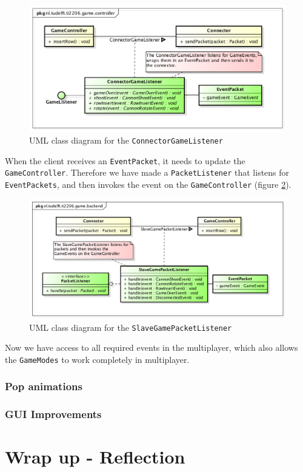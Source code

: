 \documentclass[a4paper]{article}
\begin{document}
\begin{figure}[H]
	\centering
	\includegraphics[scale=0.5]{ConnectorGameListenerExtended.png}
    \caption{UML class diagram for the \texttt{ConnectorGameListener} }
    \label{fig:connectorgamelistener}
\end{figure}

When the client receives an \texttt{EventPacket}, it needs to update the \texttt{GameController}. Therefore we have made a \texttt{PacketListener} that listens for \texttt{EventPackets}, and then invokes the event on the \texttt{GameController} (figure \ref{fig:slavegamepacketlistener}).

\begin{figure}[H]
	\centering
	\includegraphics[scale=0.5]{SlaveGamePacketListener.png}
    \caption{UML class diagram for the \texttt{SlaveGamePacketListener} }
    \label{fig:slavegamepacketlistener}
\end{figure}

Now we have access to all required events in the multiplayer, which also allows the \texttt{GameModes} to work completely in multiplayer.


\subsubsection{Pop animations}

\subsubsection{GUI Improvements}

\section{Wrap up - Reflection}

\end{document}
